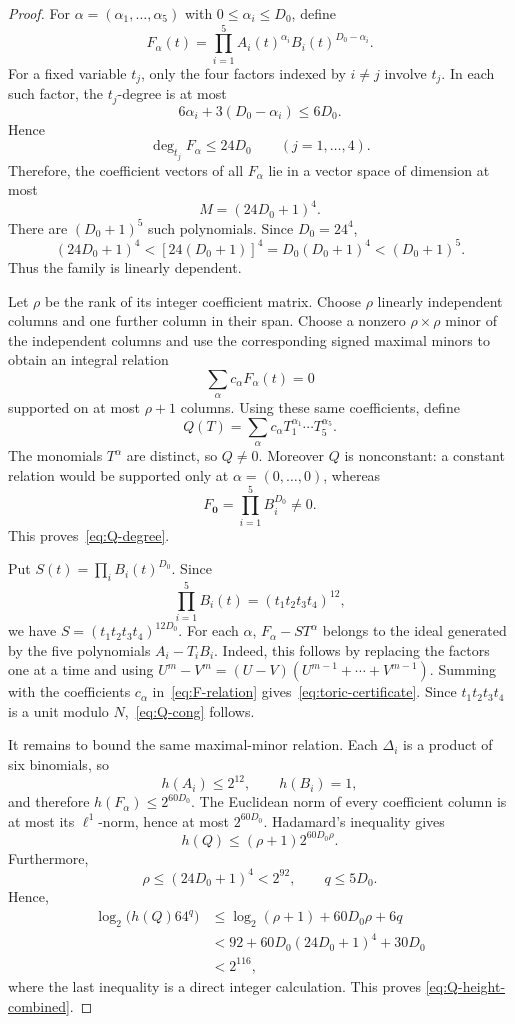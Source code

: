 \documentclass[10pt,a4paper]{amsart}
\begin{document}
\begin{proof}
For $\alpha=(\alpha_1,\ldots,\alpha_5)$ with
$0\le\alpha_i\le D_0$, define
\[
 F_\alpha(t)=\prod_{i=1}^5A_i(t)^{\alpha_i}B_i(t)^{D_0-\alpha_i}.
\]
For a fixed variable $t_j$, only the four factors indexed by $i\ne j$
involve $t_j$. In each such factor, the $t_j$-degree is at most
\[
 6\alpha_i+3(D_0-\alpha_i)\le6D_0.
\]
Hence
\[
 \deg_{t_j}F_\alpha\le24D_0\qquad(j=1,\ldots,4).
\]
Therefore, the coefficient vectors of all $F_\alpha$ lie in a vector space of
dimension at most
\[
 M=(24D_0+1)^4.
\]
There are $(D_0+1)^5$ such polynomials. Since $D_0=24^4$,
\[
 (24D_0+1)^4<[24(D_0+1)]^4
 =D_0(D_0+1)^4<(D_0+1)^5.
\]
Thus the family is linearly dependent.

Let $\rho$ be the rank of its integer coefficient matrix. Choose $\rho$
linearly independent columns and one further column in their span. Choose a
nonzero $\rho\times\rho$ minor of the independent columns and use the
corresponding signed maximal minors to obtain an integral relation
\begin{equation}\label{eq:F-relation}
 \sum_\alpha c_\alpha F_\alpha(t)=0
\end{equation}
supported on at most $\rho+1$ columns. Using these same coefficients, define
\[
 Q(T)=\sum_\alpha c_\alpha T_1^{\alpha_1}\cdots T_5^{\alpha_5}.
\]
The monomials $T^\alpha$ are distinct, so $Q\ne0$. Moreover $Q$ is
nonconstant: a constant relation would be supported only at
$\alpha=(0,\ldots,0)$, whereas
\[
 F_{\mathbf0}=\prod_{i=1}^5B_i^{D_0}\ne0.
\]
This proves~\eqref{eq:Q-degree}.

Put $S(t)=\prod_iB_i(t)^{D_0}$. Since
\[
 \prod_{i=1}^5B_i(t)=(t_1t_2t_3t_4)^{12},
\]
we have $S=(t_1t_2t_3t_4)^{12D_0}$. For each $\alpha$,
$F_\alpha-ST^\alpha$ belongs to the ideal generated by the five polynomials
$A_i-T_iB_i$. Indeed, this follows by replacing the factors one at a time and
using $U^m-V^m=(U-V)(U^{m-1}+\cdots+V^{m-1})$. Summing with the coefficients
$c_\alpha$ in~\eqref{eq:F-relation} gives~\eqref{eq:toric-certificate}.
Since $t_1t_2t_3t_4$ is a unit modulo $N$,~\eqref{eq:Q-cong} follows.

It remains to bound the same maximal-minor relation. Each $\Delta_i$ is a
product of six binomials, so
\[
 h(A_i)\le2^{12},\qquad h(B_i)=1,
\]
and therefore $h(F_\alpha)\le2^{60D_0}$. The Euclidean norm of every
coefficient column is at most its $\ell^1$-norm, hence at most $2^{60D_0}$.
Hadamard's inequality gives
\[
 h(Q)\le(\rho+1)2^{60D_0\rho}.
\]
Furthermore,
\[
 \rho\le(24D_0+1)^4<2^{92},\qquad q\le5D_0.
\]
Hence,
\[
 \begin{split}
 \log_2 \bigl(h(Q)64^q\bigr)
 &\le \log_2(\rho+1)+60D_0\rho+6q\\
 &<92+60D_0(24D_0+1)^4+30D_0\\
 &<2^{116},
 \end{split}
\]
where the last inequality is a direct integer calculation. This proves
\eqref{eq:Q-height-combined}.
\end{proof}
\end{document}

